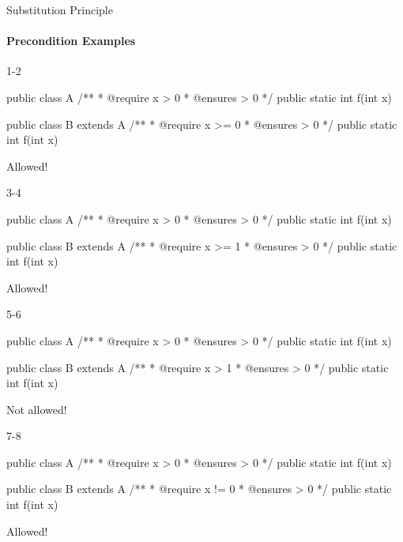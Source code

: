\documentclass[week11]{csse2002}
\begin{document}
\begin{topic}{Substitution Principle}
\framesubtitle{Precondition Examples}

\begin{subtopic}{1-2}
\begin{java}
public class A {
	/**
	 * @require x > 0
	 * @ensures \result > 0
	 */
	public static int f(int x) {}
}

public class B extends A {
	/**
	 * @require x >= 0
	 * @ensures \result > 0
	 */
	public static int f(int x) {}
}
\end{java}
\end{subtopic}

\begin{subtopic}{2}
Allowed!
\end{subtopic}

\begin{subtopic}{3-4}
\begin{java}
public class A {
	/**
	 * @require x > 0
	 * @ensures \result > 0
	 */
	public static int f(int x) {}
}

public class B extends A {
	/**
	 * @require x >= 1
	 * @ensures \result > 0
	 */
	public static int f(int x) {}
}
\end{java}
\end{subtopic}

\begin{subtopic}{4}
Allowed!
\end{subtopic}

\begin{subtopic}{5-6}
\begin{java}
public class A {
	/**
	 * @require x > 0
	 * @ensures \result > 0
	 */
	public static int f(int x) {}
}

public class B extends A {
	/**
	 * @require x > 1
	 * @ensures \result > 0
	 */
	public static int f(int x) {}
}
\end{java}
\end{subtopic}

\begin{subtopic}{6}
Not allowed!
\end{subtopic}

\begin{subtopic}{7-8}
\begin{java}
public class A {
	/**
	 * @require x > 0
	 * @ensures \result > 0
	 */
	public static int f(int x) {}
}

public class B extends A {
	/**
	 * @require x != 0
	 * @ensures \result > 0
	 */
	public static int f(int x) {}
}
\end{java}
\end{subtopic}

\begin{subtopic}{8}
Allowed!
\end{subtopic}
\end{topic}
\end{document}
